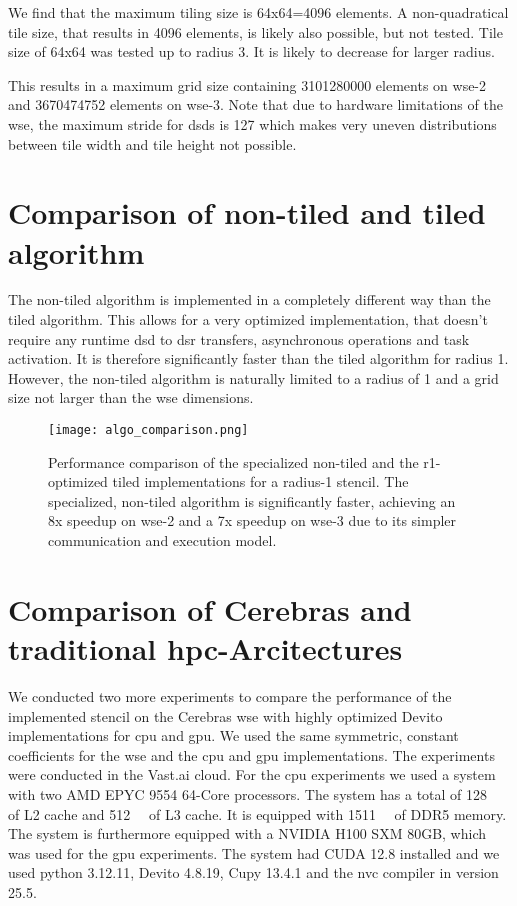 We find that the maximum tiling size  is 64x64=4096 elements.
A non-quadratical tile size, that results in 4096 elements, is likely also possible, but not tested.
Tile size of 64x64 was tested up to radius 3. It is likely to decrease for larger radius.

This results in a maximum grid size containing \num{3101280000} elements on wse-2 and \num{3670474752} elements on wse-3.
Note that due to hardware limitations of the \ac{wse}, the maximum stride for \acp{dsd} is \num{127} which makes very uneven distributions between tile width and tile height not possible.


\section{Comparison of non-tiled and tiled algorithm}

The non-tiled algorithm is implemented in a completely different way than the tiled algorithm.
This allows for a very optimized implementation, that doesn't require any runtime \ac{dsd} to \ac{dsr} transfers, asynchronous operations and task activation.
It is therefore significantly faster than the tiled algorithm for radius 1.
However, the non-tiled algorithm is naturally limited to a radius of 1 and a grid size not larger than the \ac{wse} dimensions.

\begin{figure}[h]
    \centering
    \texttt{[image: algo\_comparison.png]}
    \caption{Performance comparison of the specialized non-tiled and the r1-optimized tiled implementations for a radius-1 stencil. The specialized, non-tiled algorithm is significantly faster, achieving an 8x speedup on \ac{wse}-2 and a 7x speedup on \ac{wse}-3 due to its simpler communication and execution model.}
    \label{fig:algo_comparison}
\end{figure}

\section{Comparison of Cerebras and traditional \ac{hpc}-Arcitectures}
We conducted two more experiments to compare the performance of the implemented stencil on the Cerebras \ac{wse} with highly optimized Devito implementations for \ac{cpu} and \ac{gpu}. We used the same symmetric, constant coefficients for the \ac{wse} and the \ac{cpu} and \ac{gpu} implementations. The experiments were conducted in the Vast.ai cloud.
For the \ac{cpu} experiments we used a system with two AMD EPYC 9554 64-Core processors. The system has a total of \qty{128}{\mega\byte} of L2 cache and \qty{512}{\mega\byte} of L3 cache. It is equipped with \qty{1511}{\giga\byte} of DDR5 memory.
The system is furthermore equipped with a NVIDIA H100 SXM 80GB, which was used for the \ac{gpu} experiments. The system had CUDA 12.8 installed and we used python 3.12.11, Devito 4.8.19, Cupy 13.4.1 and the nvc compiler in version 25.5.

